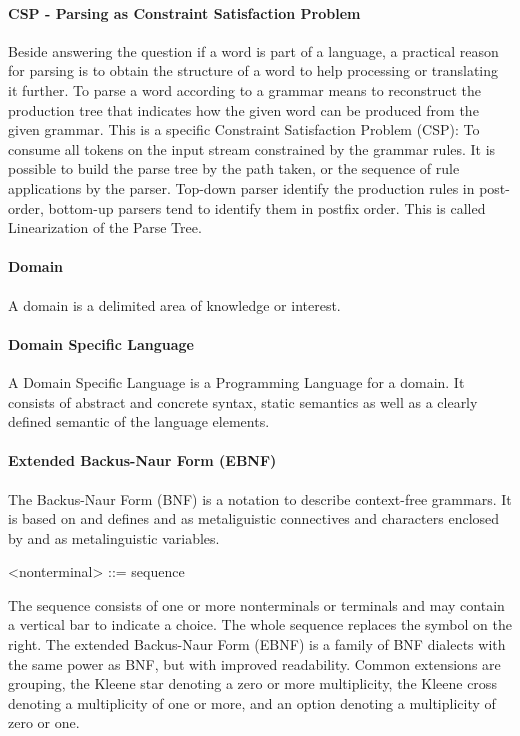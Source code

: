 \paragraph{CSP - Parsing as Constraint Satisfaction Problem} 
Beside answering the question if a word is part of a language, a practical reason for parsing is to obtain the structure of a word to help processing or translating it further. To parse a word according to a grammar means to reconstruct the production tree that indicates how the given word can be produced from the given grammar. This is a specific Constraint Satisfaction Problem (CSP): To consume all tokens on the input stream constrained by the grammar rules. It is possible to build the parse tree by the path taken, or the sequence of rule applications by the parser.  Top-down parser identify the production rules in post-order, bottom-up parsers tend to identify them in postfix order. This is called Linearization of the Parse Tree. \cite{ParserBook}

\paragraph{Domain} A domain is a delimited area of knowledge or interest. \cite{MDSD}

\paragraph{Domain Specific Language} A Domain Specific Language is a Programming Language for a domain. It consists of abstract and concrete syntax, static semantics as well as a clearly defined semantic of the language elements. \cite{MDSD}

\paragraph{Extended Backus-Naur Form (EBNF)} 
The Backus-Naur Form (BNF) is a notation to describe context-free grammars. It is based on \cite{BNF} and defines \code{:=} and \code{|} as metaliguistic connectives and characters enclosed by \code{<} and \code{>} as metalinguistic variables.
\begin{xtxt}
 <nonterminal> ::= sequence
\end{xtxt}
The sequence consists of one or more nonterminals or terminals and may contain a vertical bar to indicate a choice. The whole sequence replaces the symbol on the right. The extended Backus-Naur Form (EBNF) is a family of BNF dialects with the same power as BNF, but with improved readability. Common extensions are grouping, the Kleene star denoting a zero or more multiplicity, the Kleene cross denoting a multiplicity of one or more, and an option denoting a multiplicity of zero or one. \cite{ParserBook}
 
